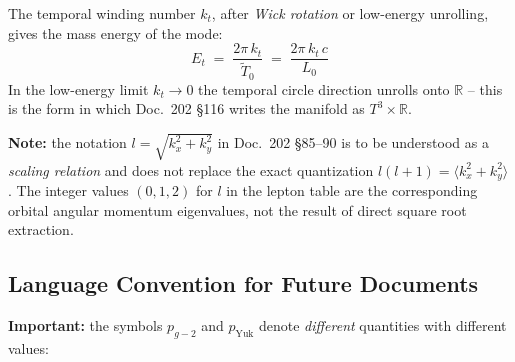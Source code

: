 The temporal winding number $k_t$, after \emph{Wick rotation} or
low-energy unrolling, gives the mass energy of the mode:
\begin{equation}
  E_t \;=\; \frac{2\pi\, k_t}{\tilde T_0} \;=\; \frac{2\pi\,k_t\,c}{L_0}
  \tag{210.7a}
\end{equation}
In the low-energy limit $k_t \to 0$ the temporal circle direction
unrolls onto $\mathbb{R}$ -- this is the form in which Doc.~202 §116
writes the manifold as $T^3 \times \mathbb{R}$.

\textbf{Note:} the notation $l = \sqrt{k_x^2+k_y^2}$ in Doc.~202 §85--90
is to be understood as a \emph{scaling relation} and does not replace
the exact quantization $l(l+1) = \langle k_x^2+k_y^2 \rangle$. The
integer values $(0,1,2)$ for $l$ in the lepton table are the
corresponding orbital angular momentum eigenvalues, not the result of
direct square root extraction.

\subsection*{Language Convention for Future Documents}

\begin{center}
\renewcommand{\arraystretch}{1.4}
{\footnotesize
{}
}
\renewcommand{\arraystretch}{1.0}
\end{center}

\textbf{Important:} the symbols $p_{g\!-\!2}$ and $p_{\text{Yuk}}$
denote \emph{different} quantities with different values:

\begin{center}
{\footnotesize
{}
}
\end{center}

